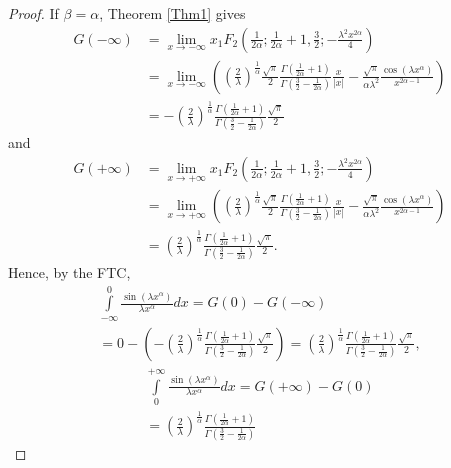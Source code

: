 \documentclass[smallextended]{svjour3}
\begin{document}
\begin{proof}
If $\beta=\alpha$, Theorem \ref{Thm1} gives
\begin{align}
G(-\infty)&=\lim_{x\rightarrow-\infty}x{}_1F_2\left(\frac{1}{2\alpha};\frac{1}{2\alpha}+1,\frac{3}{2};-\frac{\lambda^2 x^{2\alpha}}{4}\right)
\nonumber\\&=\lim_{x\rightarrow-\infty}\left(\left(\frac{2}{\lambda}\right)^{\frac{1}{\alpha}}\frac{\sqrt{\pi}}{2}\frac{\Gamma\left(\frac{1}{2\alpha}+1\right)}{\Gamma\left(\frac{3}{2}-\frac{1}{2\alpha}\right)}\frac{x}{|x|}
-\frac{\sqrt{\pi}}{\alpha\lambda^2}\frac{\cos{\left({\lambda x^\alpha}\right)}}{x^{2\alpha-1}}\right)
\nonumber\\&=-\left(\frac{2}{\lambda}\right)^{\frac{1}{\alpha}}\frac{\Gamma\left(\frac{1}{2\alpha}+1\right)}{\Gamma\left(\frac{3}{2}-\frac{1}{2\alpha}\right)}\frac{\sqrt{\pi}}{2}
\end{align}
and
\begin{align}
G(+\infty)&=\lim_{x\rightarrow+\infty}x{}_1F_2\left(\frac{1}{2\alpha};\frac{1}{2\alpha}+1,\frac{3}{2};-\frac{\lambda^2 x^{2\alpha}}{4}\right)
\nonumber\\&=\lim_{x\rightarrow+\infty}\left(\left(\frac{2}{\lambda}\right)^{\frac{1}{\alpha}}\frac{\sqrt{\pi}}{2}\frac{\Gamma\left(\frac{1}{2\alpha}+1\right)}{\Gamma\left(\frac{3}{2}-\frac{1}{2\alpha}\right)}\frac{x}{|x|}
-\frac{\sqrt{\pi}}{\alpha\lambda^2}\frac{\cos{\left({\lambda x^\alpha}\right)}}{x^{2\alpha-1}}\right)
\nonumber\\&=\left(\frac{2}{\lambda}\right)^{\frac{1}{\alpha}}\frac{\Gamma\left(\frac{1}{2\alpha}+1\right)}{\Gamma\left(\frac{3}{2}-\frac{1}{2\alpha}\right)}\frac{\sqrt{\pi}}{2}.
\end{align}
Hence, by the FTC,
\begin{multline}
\int\limits_{-\infty}^{0} \frac{\sin{(\lambda x^\alpha)
}}{\lambda x^\alpha}dx=G(0)-G(-\infty)\\=0-\left(-\left(\frac{2}{\lambda}\right)^{\frac{1}{\alpha}}\frac{\Gamma\left(\frac{1}{2\alpha}+1\right)}{\Gamma\left(\frac{3}{2}-\frac{1}{2\alpha}\right)}\frac{\sqrt{\pi}}{2}\right)
=\left(\frac{2}{\lambda}\right)^{\frac{1}{\alpha}}\frac{\Gamma\left(\frac{1}{2\alpha}+1\right)}{\Gamma\left(\frac{3}{2}-\frac{1}{2\alpha}\right)}\frac{\sqrt{\pi}}{2},
\end{multline}
\begin{multline}
\int\limits_{0}^{+\infty} \frac{\sin{(\lambda x^\alpha)
}}{\lambda x^\alpha}dx=G(+\infty)-G(0)\\=\left(\frac{2}{\lambda}\right)^{\frac{1}{\alpha}}\frac{\Gamma\left(\frac{1}{2\alpha}+1\right)}{\Gamma\left(\frac{3}{2}-\frac{1}{2\alpha}\right)}

\end{multline}
\end{proof}
\end{document}
